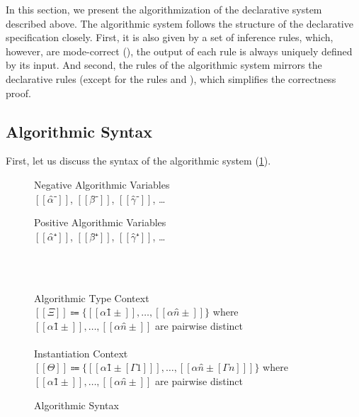 \label{sec:algorithm}

In this section, we present the algorithmization of the declarative system described above.
The algorithmic system follows the structure of the declarative specification closely.
First, it is also given by a set of inference rules, which, however,
are mode-correct (\cite{dunfield2020:bidirectional}), \ie
the output of each rule is always uniquely defined by its input.
And second, the rules of the algorithmic system mirrors the declarative rules 
(except for the rules  and ), 
which simplifies the correctness proof. 


\subsection{Algorithmic Syntax}
\label{sec:algo-syntax}

First, let us discuss the syntax of the algorithmic system (\cref{fig:algo-syntax}).

\begin{figure}[t]
  \begin{minipage}[t]{0.49\textwidth}
      Negative Algorithmic Variables\\
      $[[α̂⁻]]$, $[[β̂⁻]]$, $[[γ̂⁻]]$, \dots\\
  \end{minipage}%
  \begin{minipage}[t]{0.49\textwidth}
      Positive Algorithmic Variables\\
      $[[α̂⁺]]$, $[[β̂⁺]]$, $[[γ̂⁺]]$, \dots\\
  \end{minipage}

  \hfill\\
  \begin{minipage}[t]{0.49\textwidth}
      \ottuNShort
  \end{minipage}
  \begin{minipage}[t]{0.49\textwidth}
      \ottuPShort
  \end{minipage}
  \hfill\\
  Algorithmic Type Context\\
   $[[Ξ]] \Coloneqq \{[[α1̂±]], \dots, [[αn̂±]]\}$ where $[[α1̂±]], \dots, [[αn̂±]]$ are pairwise distinct \\
  \hfill\\
  Instantiation Context\\
   $[[Θ]] \Coloneqq \{[[ α1̂±[Γ1] ]], \dots, [[ αn̂±[Γn] ]]\}$ where $[[α1̂±]], \dots, [[αn̂±]]$ are pairwise distinct \\
  \caption{Algorithmic Syntax}
  \label{fig:algo-syntax}
\end{figure}

